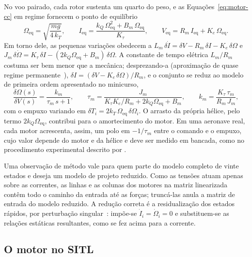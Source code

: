 No voo pairado, cada rotor sustenta um quarto do peso, e as
Equações~\eqref{eq:motor-cc} em regime fornecem o ponto de
equilíbrio~\cite{fischer2025}
\begin{equation}
\Omega_{\mathrm{eq}} = \sqrt{\frac{mg}{4\,k_T}}, \qquad
I_{\mathrm{eq}} = \frac{k_Q\,\Omega_{\mathrm{eq}}^2 + B_m\,\Omega_{\mathrm{eq}}}{K_\tau}, \qquad
V_{\mathrm{eq}} = R_m\,I_{\mathrm{eq}} + K_e\,\Omega_{\mathrm{eq}}.
\label{eq:motor-equilibrio}
\end{equation}
Em torno dele, as pequenas variações obedecem a
$L_m\,\delta\dot I = \delta V - R_m\,\delta I - K_e\,\delta\Omega$ e
$J_m\,\delta\dot\Omega = K_\tau\,\delta I - (2k_Q\Omega_{\mathrm{eq}} + B_m)\,\delta\Omega$.
A constante de tempo elétrica $L_m/R_m$ costuma ser bem menor que a mecânica;
desprezando-a (aproximação de quase regime
permanente~\cite{kokotovic1999}), $\delta I = (\delta V - K_e\,\delta\Omega)/R_m$, e o conjunto se
reduz ao modelo de primeira ordem apresentado no minicurso,
\begin{equation}
\frac{\delta\Omega(s)}{\delta V(s)} = \frac{k_m}{\tau_m\,s + 1}, \qquad
\tau_m = \frac{J_m}{K_\tau K_e/R_m + 2k_Q\Omega_{\mathrm{eq}} + B_m}, \qquad
k_m = \frac{K_\tau\,\tau_m}{R_m\,J_m},
\label{eq:motor-primeira-ordem}
\end{equation}
com o empuxo variando em $\delta T_i = 2k_T\,\Omega_{\mathrm{eq}}\,\delta\Omega_i$.
O arrasto da própria hélice, pelo termo $2k_Q\Omega_{\mathrm{eq}}$, contribui
para o amortecimento do motor. Em uma aeronave real, cada motor acrescenta,
assim, um polo em $-1/\tau_m$ entre o comando e o empuxo, cujo valor depende do
motor e da hélice e deve ser medido em bancada, como no procedimento
experimental descrito por .

Uma observação de método vale para quem parte do modelo completo de vinte
estados e deseja um modelo de projeto reduzido. Como as tensões atuam apenas
sobre as correntes, as linhas e as colunas dos motores na matriz linearizada
contêm todo o caminho da entrada até as forças; truncá-las anula a matriz de
entrada do modelo reduzido. A redução correta é a residualização dos estados
rápidos, por perturbação singular~\cite{kokotovic1999}: impõe-se $\dot I_i = \dot\Omega_i = 0$ e
substituem-se as relações estáticas resultantes, como se fez acima para a
corrente.

\subsection{O motor no SITL}
\label{sec:motor-sitl}

